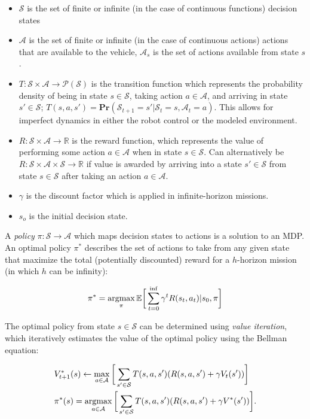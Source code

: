 \begin{itemize}
	\item $\mathcal{S}$ is the set of finite or infinite (in the case of continuous functions) decision states
	\item $\mathcal{A}$ is the set of finite or infinite (in the case of continuous actions) actions that are available to the vehicle, $\mathcal{A}_s$ is the set of actions available from state $s$.
	\item $T : \mathcal{S} \times \mathcal{A} \to \mathcal{P}(\mathcal{S})$ is the transition function which represents the probability density of being in state $s \in \mathcal{S}$, taking action $a \in \mathcal{A}$, and arriving in state $s' \in \mathcal{S}$; $T(s,a,s') = \mathbf{Pr}(\mathcal{S}_{t+1} = s' | \mathcal{S}_t = s, \mathcal{A}_t = a)$. This allows for imperfect dynamics in either the robot control or the modeled environment.
	\item $R : \mathcal{S} \times \mathcal{A} \to \mathbb{R}$ is the reward function, which represents the value of performing some action $a \in \mathcal{A}$ when in state $s \in \mathcal{S}$. Can alternatively be $R : \mathcal{S} \times \mathcal{A} \times \mathcal{S} \to \mathbb{R}$ if value is awarded by arriving into a state $s' \in \mathcal{S}$ from state $s \in \mathcal{S}$ after taking an action $a \in \mathcal{A}$.
	\item $\gamma$ is the discount factor which is applied in infinite-horizon missions.
	\item $s_o$ is the initial decision state.
\end{itemize}

A \emph{policy} $\pi : \mathcal{S} \to \mathcal{A}$ which maps decision states to actions is a solution to an MDP.
An optimal policy $\pi^*$ describes the set of actions to take from any given state that maximize the total (potentially discounted) reward for a $h$-horizon mission (in which $h$ can be infinity):

\begin{equation}
\pi^* = \mathop\mathrm{arg max}_{\pi} \mathbb{E}\bigg[\sum_{t=0}^{\inf} \gamma^t R(s_t, a_t) | s_0, \pi\bigg]
\label{eq:optimal_policy}
\end{equation}

The optimal policy from state $s \in \mathcal{S}$ can be determined using \emph{value iteration}, which iteratively estimates the value of the optimal policy using the Bellman equation\autocite{bellman1957markovian}:

\begin{equation}
\begin{split}
&V_{t+1}^*(s) \leftarrow \max_{a \in \mathcal{A}}\bigg[\sum_{s' \in \mathcal{S}} T(s,a,s')(R(s,a,s') + \gamma V_t(s'))\bigg] \\
&\pi^*(s) = \mathop\mathrm{arg max}_{a \in \mathcal{A}}\bigg[\sum_{s' \in \mathcal{S}}T(s,a,s')(R(s,a,s') + \gamma V^*(s'))\bigg].
\end{split}
\end{equation}

